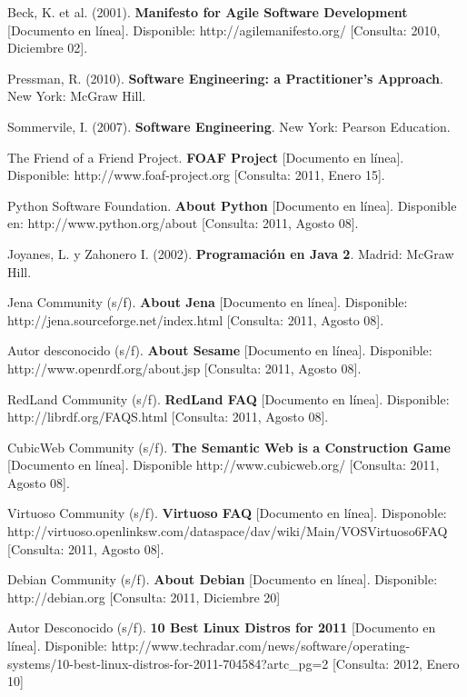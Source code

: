 \begin{thebibliography}{20}
     Beck, K. et al. (2001). \textbf{Manifesto for Agile Software Development} [Documento en línea]. Disponible: http://agilemanifesto.org/ [Consulta: 2010, Diciembre 02].

     Pressman, R. (2010). \textbf{Software Engineering: a Practitioner's Approach}. New York: McGraw Hill.

     Sommervile, I. (2007). \textbf{Software Engineering}. New York: Pearson Education.

     The Friend of a Friend Project. \textbf{FOAF Project} [Documento en línea]. Disponible: http://www.foaf-project.org [Consulta: 2011, Enero 15].

     Python Software Foundation. \textbf{About Python} [Documento en línea]. Disponible en: http://www.python.org/about [Consulta: 2011, Agosto 08].

     Joyanes, L. y Zahonero I. (2002). \textbf{Programación en Java 2}. Madrid: McGraw Hill.

     Jena Community (s/f). \textbf{About Jena} [Documento en línea]. Disponible: http://jena.sourceforge.net/index.html [Consulta: 2011, Agosto 08].

     Autor desconocido (s/f). \textbf{About Sesame} [Documento en línea]. Disponible: http://www.openrdf.org/about.jsp [Consulta: 2011, Agosto 08].

     RedLand Community (s/f). \textbf{RedLand FAQ} [Documento en línea]. Disponible: http://librdf.org/FAQS.html [Consulta: 2011, Agosto 08].

     CubicWeb Community (s/f). \textbf{The Semantic Web is a Construction Game} [Documento en línea]. Disponible http://www.cubicweb.org/ [Consulta: 2011, Agosto 08].

     Virtuoso Community (s/f). \textbf{Virtuoso FAQ} [Documento en línea]. Disponoble: http://virtuoso.openlinksw.com/dataspace/dav/wiki/Main/VOSVirtuoso6FAQ [Consulta: 2011, Agosto 08].

     Debian Community (s/f). \textbf{About Debian} [Documento en línea]. Disponible: http://debian.org [Consulta: 2011, Diciembre 20]

     Autor Desconocido (s/f). \textbf{10 Best Linux Distros for 2011} [Documento en línea]. Disponible: http://www.techradar.com/news/software/operating-systems/10-best-linux-distros-for-2011-704584?artc\_pg=2 [Consulta: 2012, Enero 10]


\end{thebibliography}
